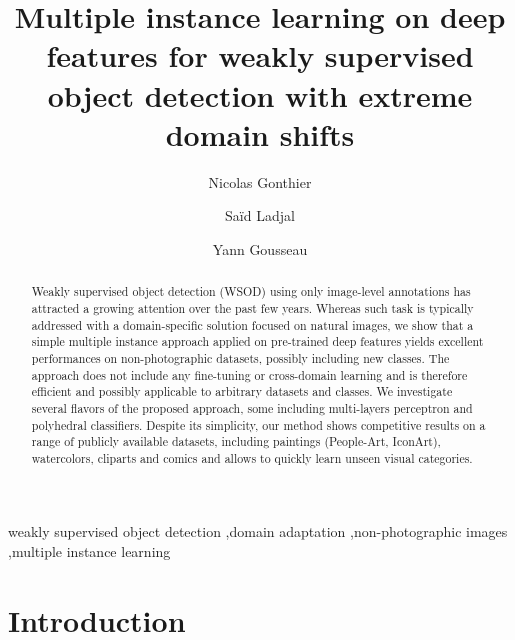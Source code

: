 \documentclass[preprint]{elsarticle}
\begin{document}
\setcounter{secnumdepth}{3} 

\begin{frontmatter}

\title{Multiple instance learning on deep features for weakly supervised object detection with extreme domain shifts}
\author[telecomadress,UPSaclay]{Nicolas Gonthier}

\author[telecomadress]{Sa\"id Ladjal}
\author[telecomadress]{Yann Gousseau}
\address[telecomadress]{LTCI, T\'el\'ecom Paris, Institut Polytechnique de Paris, 19 Place Marguerite Perey, 91120 Palaiseau, France}
\address[UPSaclay]{Universit\'e Paris-Saclay, 91190, Saint-Aubin, France}



\begin{abstract}
Weakly supervised object detection (WSOD) using only image-level annotations has attracted a growing attention over the past few years. Whereas such task is typically addressed with a domain-specific solution focused on natural images, we show that a simple multiple instance approach applied on pre-trained deep features yields excellent performances on non-photographic datasets, possibly including new classes. The approach does not include any fine-tuning or cross-domain learning and is therefore efficient and possibly applicable to arbitrary datasets and classes. We investigate several flavors of the proposed approach, some including multi-layers perceptron and polyhedral classifiers. 
Despite its simplicity, our method shows competitive results on a range of publicly available datasets, including paintings (People-Art, IconArt), watercolors, cliparts and comics and allows to quickly learn unseen visual categories.
\end{abstract}

\begin{keyword}
weakly supervised object detection \sep domain adaptation  \sep non-photographic images \sep multiple instance learning 
\end{keyword}

\end{frontmatter}



\section{Introduction}
\end{document}
